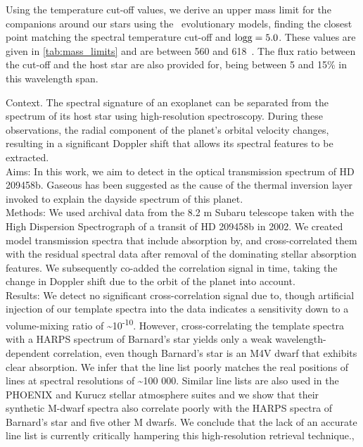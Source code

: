 Using the temperature cut-off values, we derive an upper mass limit for the companions around our stars using the~\citet{baraffe_new_2015} evolutionary models, finding the closest point matching the spectral temperature cut-off and \(\textrm{logg}{}=5.0\).
These values are given in \cref{tab:mass_limits} and are between 560 and 618~\Mjup{}.
The flux ratio between the cut-off and the host star are also provided for, being between 5 and 15\% in this wavelength span.







\citet{hoeijmakers_search_2015}
{Context.
The spectral signature of an exoplanet can be separated from the spectrum of its host star using high-resolution spectroscopy.
During these observations, the radial component of the planet's orbital velocity changes, resulting in a significant Doppler shift that allows its spectral features to be extracted. \\
     Aims: In this work, we aim to detect in the optical transmission spectrum of HD 209458b.
Gaseous has been suggested as the cause of the thermal inversion layer invoked to explain the dayside spectrum of this planet. \\
     Methods: We used archival data from the 8.2 m Subaru telescope taken with the High Dispersion Spectrograph of a transit of HD 209458b in 2002.
We created model transmission spectra that include absorption by, and cross-correlated them with the residual spectral data after removal of the dominating stellar absorption features.
We subsequently co-added the correlation signal in time, taking the change in Doppler shift due to the orbit of the planet into account. \\
     Results: We detect no significant cross-correlation signal due to, though artificial injection of our template spectra into the data indicates a sensitivity down to a volume-mixing ratio of \textasciitilde{}10\textsuperscript{-10}.
However, cross-correlating the template spectra with a {HARPS} spectrum of Barnard's star yields only a weak wavelength-dependent correlation, even though Barnard's star is an M4V dwarf that exhibits clear  absorption.
We infer that the line list poorly matches the real positions of lines at spectral resolutions of \textasciitilde{}100 000.
Similar line lists are also used in the {PHOENIX} and Kurucz stellar atmosphere suites and we show that their synthetic M-dwarf spectra also correlate poorly with the {HARPS} spectra of Barnard's star and five other M dwarfs.
We conclude that the lack of an accurate line list is currently critically hampering this high-resolution retrieval technique.},




